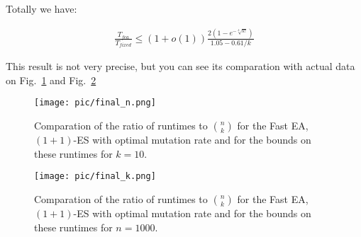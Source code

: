 \documentclass{article}
\begin{document}
Totally we have:

\begin{align*}
  \frac{T_{fea}}{T_{fixed}} \le (1 + o(1)) \frac{2(1 - e^{-\sqrt[k]{k!}})}{1.05 - 0.61/k}
\end{align*}

This result is not very precise, but you can see its comparation with actual data on Fig.~\ref{comparation_n} and Fig.~\ref{comparation_k}

\begin{figure}
  \begin{center}
    \texttt{[image: pic/final\_n.png]}
  \end{center}
  \caption{Comparation of the ratio of runtimes to $\binom{n}{k}$ for the Fast EA, $(1 + 1)$-ES with optimal mutation rate and for the bounds on these runtimes for $k = 10$.\label{comparation_n}}
\end{figure}


\begin{figure}
  \begin{center}
    \texttt{[image: pic/final\_k.png]}
  \end{center}
  \caption{Comparation of the ratio of runtimes to $\binom{n}{k}$ for the Fast EA, $(1 + 1)$-ES with optimal mutation rate and for the bounds on these runtimes for $n = 1000$.\label{comparation_k}}
\end{figure}

\printbibliography
\end{document}
